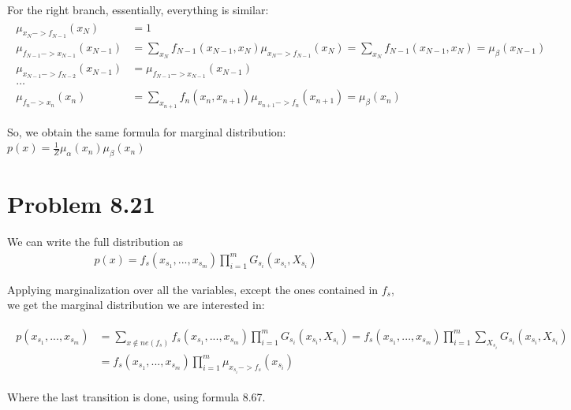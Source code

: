 \documentclass[fleqn]{article}
\begin{document}
For the right branch, essentially, everything is similar:
\begin{align}
	\begin{split}
		\mu_{x_N->f_{N-1}} (x_N)&= 1 \\
		\mu_{f_{N-1}->x_{N-1}} (x_{N-1})&= \sum\limits_{x_N}f_{N-1}(x_{N-1}, x_N)\mu_{x_{N}->f_{N-1}}(x_N) = \sum\limits_{x_N}f_{N-1}(x_{N-1}, x_N) = \mu_\beta(x_{N-1})\\
		\mu_{x_{N-1}->f_{N-2}}(x_{N-1}) &= \mu_{f_{N-1}->x_{N-1}}(x_{N-1})\\
		\ldots\\
		\mu_{f_{n}->x_n}(x_n) &= \sum\limits_{x_{n+1}}f_{n}(x_{n}, x_{n+1})\mu_{x_{n+1}->f_{n}}(x_{n+1}) = \mu_\beta(x_n)
	\end{split}
\end{align}

So, we obtain the same formula for marginal distribution: $p(x) = \frac{1}{Z}\mu_\alpha(x_n) \mu_\beta(x_n)$

\section*{Problem 8.21}

We can write the full distribution as 
\begin{align}
	p(x) = f_s(x_{s_1},...,x_{s_m})\prod\limits_{i=1}^mG_{s_i}(x_{s_i}, X_{s_i})
\end{align}

Applying marginalization over all the variables, except the ones contained in $f_s$, we get the marginal distribution we are interested in: 

\begin{align}
	\begin{split}
	p(x_{s_1},...,x_{s_m}) &= \sum\limits_{x \notin ne(f_s)}f_s(x_{s_1},...,x_{s_m})\prod\limits_{i=1}^mG_{s_i}(x_{s_i}, X_{s_i}) = f_s(x_{s_1},...,x_{s_m})\prod\limits_{i=1}^m\sum\limits_{X_{s_i}}G_{s_i}(x_{s_i}, X_{s_i}) \\
	&= f_s(x_{s_1},...,x_{s_m})\prod\limits_{i=1}^m\mu_{x_{s_i}->f_s}(x_{s_i})
	\end{split}
\end{align}

Where the last transition is done, using formula 8.67.
\end{document}
